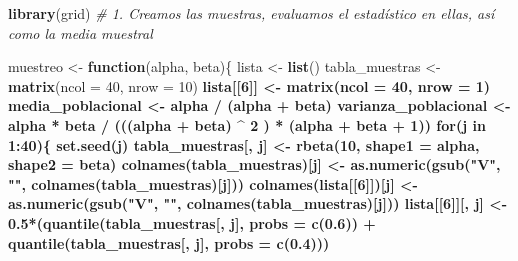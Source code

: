 \documentclass[
]{article}
\newenvironment{Shaded}{\begin{snugshade}}{\end{snugshade}}
\newcommand{\CommentTok}[1]{\textcolor[rgb]{0.56,0.35,0.01}{\textit{#1}}}
\newcommand{\ControlFlowTok}[1]{\textcolor[rgb]{0.13,0.29,0.53}{\textbf{#1}}}
\newcommand{\DataTypeTok}[1]{\textcolor[rgb]{0.13,0.29,0.53}{#1}}
\newcommand{\DecValTok}[1]{\textcolor[rgb]{0.00,0.00,0.81}{#1}}
\newcommand{\FloatTok}[1]{\textcolor[rgb]{0.00,0.00,0.81}{#1}}
\newcommand{\KeywordTok}[1]{\textcolor[rgb]{0.13,0.29,0.53}{\textbf{#1}}}
\newcommand{\NormalTok}[1]{#1}
\newcommand{\OperatorTok}[1]{\textcolor[rgb]{0.81,0.36,0.00}{\textbf{#1}}}
\newcommand{\StringTok}[1]{\textcolor[rgb]{0.31,0.60,0.02}{#1}}
\begin{document}
\begin{Shaded}
\begin{Highlighting}[]
\KeywordTok{library}\NormalTok{(grid)}
\CommentTok{# 1. Creamos las muestras, evaluamos el estadístico en ellas, así como la media muestral}

\NormalTok{muestreo <-}\StringTok{ }\ControlFlowTok{function}\NormalTok{(alpha, beta)\{}
\NormalTok{        lista <-}\StringTok{ }\KeywordTok{list}\NormalTok{()}
\NormalTok{        tabla_muestras <-}\StringTok{ }\KeywordTok{matrix}\NormalTok{(}\DataTypeTok{ncol =} \DecValTok{40}\NormalTok{, }\DataTypeTok{nrow =} \DecValTok{10}\NormalTok{) }\OperatorTok{%>%}\StringTok{ }\KeywordTok{as.data.frame}\NormalTok{()}
\NormalTok{        lista[[}\DecValTok{6}\NormalTok{]] <-}\StringTok{ }\KeywordTok{matrix}\NormalTok{(}\DataTypeTok{ncol =} \DecValTok{40}\NormalTok{, }\DataTypeTok{nrow =} \DecValTok{1}\NormalTok{) }\OperatorTok{%>%}\StringTok{ }\KeywordTok{as.data.frame}\NormalTok{()}
\NormalTok{        media_poblacional <-}\StringTok{ }\NormalTok{alpha }\OperatorTok{/}\StringTok{ }\NormalTok{(alpha }\OperatorTok{+}\StringTok{ }\NormalTok{beta)}
\NormalTok{        varianza_poblacional <-}\StringTok{ }\NormalTok{alpha }\OperatorTok{*}\StringTok{ }\NormalTok{beta }\OperatorTok{/}\StringTok{ }\NormalTok{(((alpha }\OperatorTok{+}\StringTok{ }\NormalTok{beta) }\OperatorTok{^}\StringTok{ }\DecValTok{2}\NormalTok{ ) }\OperatorTok{*}\StringTok{ }\NormalTok{(alpha }\OperatorTok{+}\StringTok{ }\NormalTok{beta }\OperatorTok{+}\StringTok{ }\DecValTok{1}\NormalTok{))}
        \ControlFlowTok{for}\NormalTok{(j }\ControlFlowTok{in} \DecValTok{1}\OperatorTok{:}\DecValTok{40}\NormalTok{)\{}
                \KeywordTok{set.seed}\NormalTok{(j)}
\NormalTok{                tabla_muestras[, j] <-}\StringTok{ }\KeywordTok{rbeta}\NormalTok{(}\DecValTok{10}\NormalTok{, }\DataTypeTok{shape1 =}\NormalTok{ alpha, }\DataTypeTok{shape2 =}\NormalTok{ beta)}
                \KeywordTok{colnames}\NormalTok{(tabla_muestras)[j] <-}\StringTok{ }\KeywordTok{as.numeric}\NormalTok{(}\KeywordTok{gsub}\NormalTok{(}\StringTok{"V"}\NormalTok{, }\StringTok{""}\NormalTok{, }\KeywordTok{colnames}\NormalTok{(tabla_muestras)[j]))}
                \KeywordTok{colnames}\NormalTok{(lista[[}\DecValTok{6}\NormalTok{]])[j] <-}\StringTok{  }\KeywordTok{as.numeric}\NormalTok{(}\KeywordTok{gsub}\NormalTok{(}\StringTok{"V"}\NormalTok{, }\StringTok{""}\NormalTok{, }\KeywordTok{colnames}\NormalTok{(tabla_muestras)[j]))}
\NormalTok{                lista[[}\DecValTok{6}\NormalTok{]][, j] <-}\StringTok{ }\FloatTok{0.5}\OperatorTok{*}\NormalTok{(}\KeywordTok{quantile}\NormalTok{(tabla_muestras[, j], }\DataTypeTok{probs =} \KeywordTok{c}\NormalTok{(}\FloatTok{0.6}\NormalTok{)) }\OperatorTok{+}\StringTok{ }\KeywordTok{quantile}\NormalTok{(tabla_muestras[, j], }\DataTypeTok{probs =} \KeywordTok{c}\NormalTok{(}\FloatTok{0.4}\NormalTok{)))}
}}
\end{Highlighting}
\end{Shaded}
\end{document}
